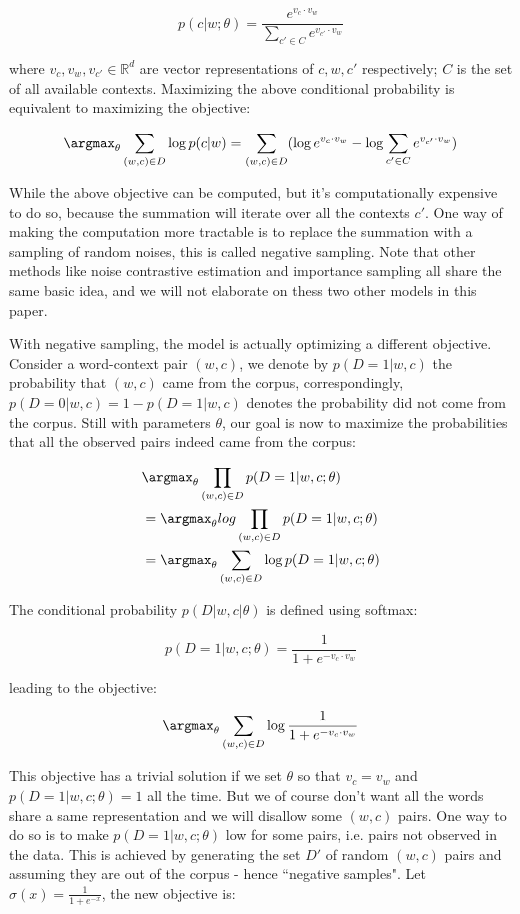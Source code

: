 $$p(c|w;\theta) = \frac{e^{v_c\cdot v_w}}{\sum_{c'\in C}e^{v_{c'}\cdot v_w}}$$

where $v_c, v_w, v_{c'} \in \mathbb{R}^d$ are vector representations of $c, w, c'$ respectively; $C$ is the set of all available contexts. Maximizing the above conditional probability is equivalent to maximizing the objective:

$$\argmax_{\theta}\sum_{(w,c)\in D} \log p(c|w)
= \sum_{(w,c)\in D} (\log e^{v_c\cdot v_w} - \log\sum_{c'\in C}e^{v_{c'}\cdot v_w})$$

While the above objective can be computed, but it's computationally expensive to do so, because the summation will iterate over all the contexts $c'$. One way of making the computation more tractable is to replace the summation with a sampling of random noises, this is called negative sampling. Note that other methods like noise contrastive estimation \cite{mnih2013learning} and importance sampling \cite{bengio2003quick,bengio2008adaptive} all share the same basic idea, and we will not elaborate on thess two other models in this paper.

With negative sampling, the model is actually optimizing a different objective. Consider a word-context pair $(w,c)$, we denote by $p(D=1|w,c)$ the probability that $(w,c)$ came from the corpus, correspondingly, $p(D=0|w,c)=1-p(D=1|w,c)$ denotes the probability did not come from the corpus. Still with parameters $\theta$, our goal is now to maximize the probabilities that all the observed pairs indeed came from the corpus:

\begin{align*}
    &\argmax_{\theta}\prod_{(w,c)\in D} p(D=1|w,c;\theta) \\
    &=\argmax_{\theta} log \prod_{(w,c)\in D} p(D=1|w,c;\theta) \\
    &=\argmax_{\theta} \sum_{(w,c)\in D} \log p(D=1|w,c;\theta)
\end{align*}

The conditional probability $p(D|w,c|\theta)$ is defined using softmax:

$$p(D=1|w,c;\theta)=\frac{1}{1+e^{-v_c\cdot v_w}}$$

leading to the objective:

$$\argmax_{\theta}\sum_{(w,c)\in D}\log \frac{1}{1+e^{-v_c\cdot v_w}}$$

This objective has a trivial solution if we set $\theta$ so that $v_c=v_w$ and $p(D=1|w,c;\theta)=1$ all the time. But we of course don't want all the words share a same representation and we will disallow some $(w,c)$ pairs. One way to do so is to make $p(D=1|w,c;\theta)$ low for some pairs, i.e. pairs not observed in the data. This is achieved by generating the set $D'$ of random $(w,c)$ pairs and assuming they are out of the corpus - hence ``negative samples". Let $\sigma(x)=\frac{1}{1+e^{-x}}$, the new objective is:

